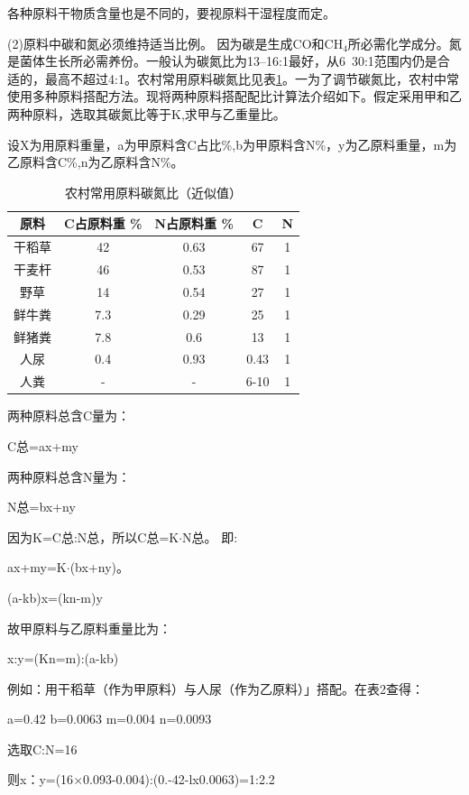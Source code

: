 \documentclass{ctexbook}
\begin{document}
各种原料干物质含量也是不同的，要视原料干湿程度而定。

(2)原料中碳和氮必须维持适当比例。
因为碳是生成CO和CH$_4$所必需化学成分。氮是菌体生长所必需养份。一般认为碳氮比为13--16:1最好，从6~30:1范围内仍是合适的，最高不超过4:1。农村常用原料碳氮比见表\ref{tab:tandanbi}。一为了调节碳氮比，农村中常使用多种原料搭配方法。现将两种原料搭配配比计算法介绍如下。假定采用甲和乙两种原料，选取其碳氮比等于K,求甲与乙重量比。

设X为用原料重量，a为甲原料含C占比\%,b为甲原料含N\%，y为乙原料重量，m为乙原料含C\%,n为乙原料含N\%。

\begin{table}[htbp]
	\centering
	\caption{农村常用原料碳氮比（近似值）}
	\begin{tabular}{c|c|c|c|c}
		\hline
		原料    &  C占原料重 \% & N占原料重 \% & C     & N \\ \hline
		干稻草   & 42    & 0.63  & 67    & 1 \\ \hline
		干麦杆   & 46    & 0.53  & 87    & 1 \\ \hline
		野草    & 14    & 0.54  & 27    & 1 \\ \hline
		鲜牛粪  & 7.3   & 0.29  & 25    & 1 \\ \hline
		鲜猪粪   & 7.8   & 0.6   & 13    & 1 \\ \hline
		人尿    & 0.4   & 0.93  & 0.43  & 1 \\ \hline
		人粪    & -     & -     & 6-10  & 1 \\ 
		\hline
	\end{tabular}%
	\label{tab:tandanbi}%
\end{table}%

两种原料总含C量为：

C总=ax+my

两种原料总含N量为：

N总=bx+ny

因为K=C总:N总，所以C总=K$\cdot$N总。
即:

ax+my=K$\cdot$(bx+ny)。

(a-kb)x=(kn-m)y

故甲原料与乙原料重量比为：

x:y=(Kn=m):(a-kb)

例如：用干稻草（作为甲原料）与人尿（作为乙原料）」搭配。在表2查得：

a=0.42 b=0.0063 m=0.004 n=0.0093

选取C:N=16

则x：y=(16$\times$0.093-0.004):(0.-42-lx0.0063)=1:2.2
\end{document}
